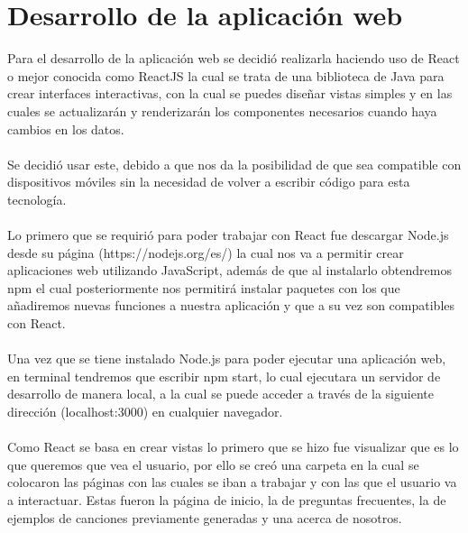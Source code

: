 \documentclass[12pt, a4paper, titlepage]{article}
\begin{document}
	\section{Desarrollo de la aplicación web}
	Para el desarrollo de la aplicación web se decidió realizarla haciendo uso de React o mejor conocida como ReactJS la cual se trata de una biblioteca de Java para crear interfaces interactivas, con la cual se puedes diseñar vistas simples y en las cuales se actualizarán y renderizarán los componentes necesarios cuando haya cambios en los datos.\\\\
	Se decidió usar este, debido a que nos da la posibilidad de que sea compatible con dispositivos móviles sin la necesidad de volver a escribir código para esta tecnología.\\\\
	Lo primero que se requirió para poder trabajar con React fue descargar Node.js desde su página (https://nodejs.org/es/) la cual nos va a permitir crear aplicaciones web utilizando JavaScript, además de que al instalarlo obtendremos npm el cual posteriormente nos permitirá instalar paquetes con los que añadiremos nuevas funciones a nuestra aplicación y que a su vez son compatibles con React.\\\\
	Una vez que se tiene instalado Node.js para poder ejecutar una aplicación web, en terminal tendremos que escribir npm start, lo cual ejecutara un servidor de desarrollo de manera local, a la cual se puede acceder a través de la siguiente dirección (localhost:3000) en cualquier navegador.\\\\
	Como React se basa en crear vistas lo primero que se hizo fue visualizar que es lo que queremos que vea el usuario, por ello se creó una carpeta en la cual se colocaron las páginas con las cuales se iban a trabajar y con las que el usuario va a interactuar. Estas fueron la página de inicio, la de preguntas frecuentes, la de ejemplos de canciones previamente generadas y una acerca de nosotros.\\\\
\end{document}
